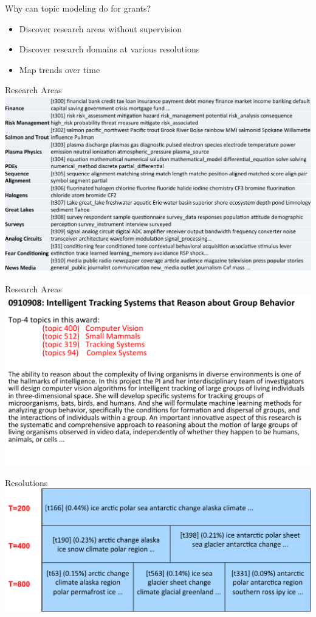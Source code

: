 
\begin{frame}{Why can topic modeling do for grants?}
  \begin{itemize}
    \item Discover research areas without supervision
    \item Discover research domains at various resolutions
    \item Map trends over time
  \end{itemize}
\end{frame}

\begin{frame}{Research Areas}
  \includegraphics[width=1.0\linewidth]{topic_models/nsf_topics}
\end{frame}

\begin{frame}{Research Areas}
  \includegraphics[width=1.0\linewidth]{topic_models/nsf_topic_ex}
\end{frame}

\begin{frame}{Resolutions}
  \includegraphics[width=1.0\linewidth]{topic_models/nsf_resolution}
\end{frame}

